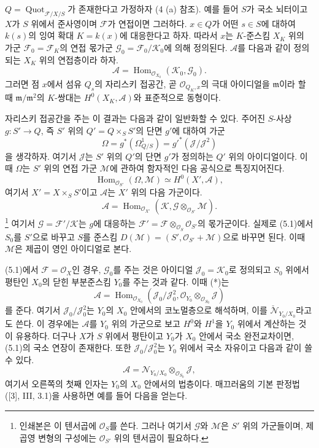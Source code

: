 $Q=\operatorname{Quot}_{\mathcal F/X/S}$가 존재한다고 가정하자
(4 (a) 참조). 예를 들어 $S$가 국소 뇌터이고 $X$가 $S$ 위에서
준사영이며 $\mathcal F$가 연접이면 그러하다. $x\in Q$가 어떤
$s\in S$에 대하여 $k(s)$의 잉여 확대 $K=k(x)$에 대응한다고 하자.
따라서 $x$는 $K$-준스킴 $X_K$ 위의 가군
$\mathcal F_0=\mathcal F_K$의 연접 몫가군
$\mathcal G_0=\mathcal F_0/\mathcal K_0$에 의해 정의된다. $\mathcal A$를
다음과 같이 정의되는 $X_K$ 위의 연접층이라 하자.
\[
\mathcal A=\operatorname{Hom}_{\mathcal O_{X_0}}(\mathcal K_0,\mathcal G_0).
\]
그러면 점 $x$에서 섬유 $Q_s$의 자리스키 접공간, 곧
$\mathcal O_{Q_K,x}$의 극대 아이디얼을 $\mathfrak m$이라 할 때
$\mathfrak m/\mathfrak m^2$의 $K$-쌍대는 $H^0(X_K,\mathcal A)$와
표준적으로 동형이다.

자리스키 접공간을 주는 이 결과는 다음과 같이 일반화할 수 있다. 주어진
$S$-사상 $g:S'\longrightarrow Q$, 즉 $S'$ 위의
$Q'=Q\times_SS'$의 단면 $g'$에 대하여 가군
\[
\Omega=g^*(\Omega^1_{Q/S})=g'^*(\mathcal J/\mathcal J^2)
\]
을 생각하자. 여기서 $\mathcal J$는 $S'$ 위의 $Q'$의 단면 $g'$가
정의하는 $Q'$ 위의 아이디얼이다. 이때 $\Omega$는 $S'$ 위의 연접 가군
$\mathcal M$에 관하여 함자적인 다음 공식으로 특징지어진다.
\[
\operatorname{Hom}_{\mathcal O_{S'}}(\Omega,\mathcal M)
\simeq H^0(X',\mathcal A),
\]
여기서 $X'=X\times_SS'$이고 $\mathcal A$는 $X'$ 위의 다음 가군이다.
\[
\mathcal A=\operatorname{Hom}_{\mathcal O_{X'}}
(\mathcal K,\mathcal G\otimes_{\mathcal O_{S'}}\mathcal M).
\]
\footnote{인쇄본은 이 텐서곱에 $\mathcal O_S$를 쓴다. 그러나 여기서
$\mathcal G$와 $\mathcal M$은 $S'$ 위의 가군들이며, 제곱영 변형의
구성에는 $\mathcal O_{S'}$ 위의 텐서곱이 필요하다.}
여기서 $\mathcal G=\mathcal F'/\mathcal K$는 $g$에 대응하는
$\mathcal F'=\mathcal F\otimes_{\mathcal O_S}\mathcal O_{S'}$의
몫가군이다. 실제로 (5.1)에서 $S_0$를 $S'$으로 바꾸고 $S$를 준스킴
$D(\mathcal M)=(S',\mathcal O_{S'}+\mathcal M)$으로 바꾸면 된다. 이때
$\mathcal M$은 제곱이 영인 아이디얼로 본다.

(5.1)에서 $\mathcal F=\mathcal O_X$인 경우, $\mathcal G_0$를 주는 것은
아이디얼 $\mathcal J_0=\mathcal K_0$로 정의되고 $S_0$ 위에서 평탄인
$X_0$의 닫힌 부분준스킴 $Y_0$를 주는 것과 같다. 이때 (*)는
\[
\mathcal A=\operatorname{Hom}_{\mathcal O_{X_0}}
(\mathcal J_0/\mathcal J_0^2,
\mathcal O_{Y_0}\otimes_{\mathcal O_{S_0}}\mathcal J)
\]
를 준다. 여기서 $\mathcal J_0/\mathcal J_0^2$는 $Y_0$의 $X_0$ 안에서의
코노멀층으로 해석하며, 이를
$\check{\mathcal N}_{Y_0/X_0}$라고도 쓴다. 이 경우에는 $\mathcal A$를
$Y_0$ 위의 가군으로 보고 $H^0$와 $H^1$을 $Y_0$ 위에서 계산하는 것이
유용하다. 더구나 $X$가 $S$ 위에서 평탄이고 $Y_0$가 $X_0$ 안에서
국소 완전교차이면, (5.1)의 국소 연장이 존재한다. 또한
$\mathcal J_0/\mathcal J_0^2$는 $Y_0$ 위에서 국소 자유이고 다음과 같이
쓸 수 있다.
\[
\mathcal A=\mathcal N_{Y_0/X_0}\otimes_{\mathcal O_{S_0}}\mathcal J,
\]
여기서 오른쪽의 첫째 인자는 $Y_0$의 $X_0$ 안에서의 법층이다.
매끄러움의 기본 판정법([3], III, 3.1)을 사용하면 예를 들어 다음을
얻는다.

